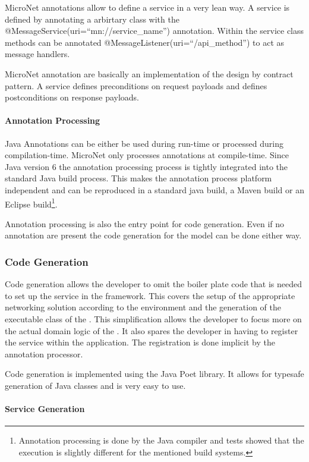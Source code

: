 MicroNet annotations allow to define a service in a very lean way. A service is
defined by annotating a arbirtary class with the
@MessageService(uri=``mn://service\_name'') annotation. Within the service class
methods can be annotated @MessageListener(uri=``/api\_method'') to act as
message handlers. 

MicroNet annotation are basically an implementation of the design by contract
pattern. A service defines preconditions on request payloads and
defines postconditions on response payloads.
 
 \paragraph{Annotation Processing}
 
Java Annotations can be either be used during run-time or processed during
compilation-time. MicroNet only processes annotations at compile-time. Since
Java version 6 the annotation processing process is tightly integrated into the
standard Java build process. This makes the annotation process platform
independent and can be reproduced in a standard java build, a Maven build or an
Eclipse build\footnote{Annotation processing is done by the Java compiler and
tests showed that the execution is slightly different for the mentioned build
systems.}.

Annotation processing is also the entry point for code generation. Even if no
annotation are present the code generation for the model can be done either way.

\subsubsection{Code Generation}

Code generation allows the developer to omit  the boiler plate code that is
needed to set up the service in the framework. This covers the setup of the
appropriate networking solution according to the environment and the generation
of the executable class of the \ms{}. This simplification allows the developer
to focus more on the actual domain logic of the \ms{}. It also spares the
developer in having to register the service within the application. The
registration is done implicit by the annotation processor.

Code generation is implemented using the Java Poet library. It allows for
typesafe generation of Java classes and is very easy to use. 

\paragraph{Service Generation}

